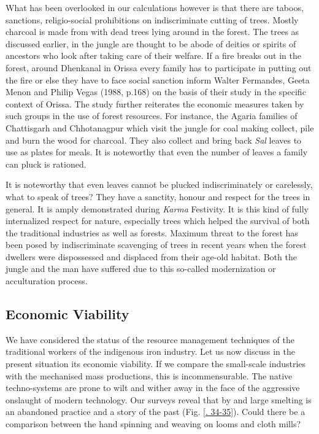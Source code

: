 What has been overlooked in our calculations however is that there are taboos, sanctions, religio-social prohibitions on indiscriminate cutting of trees. Mostly charcoal is made from with dead trees lying around in the forest. The trees as discussed earlier, in the jungle are thought to be abode of deities or spirits of ancestors who look after taking care of their welfare. If a fire breaks out in the forest, around Dhenkanal in Orissa every family has to participate in putting out the fire or else they have to face social sanction inform Walter Fermandes, Geeta Menon and Philip Vegas (1988, p.168) on the basis of their study in the specific context of Orissa. The study further reiterates the economic measures taken by such groups in the use of forest resources. For instance, the Agaria families of Chattisgarh and Chhotanagpur which visit the jungle for coal making collect, pile and burn the wood for charcoal. They also collect and bring back {\it Sal} leaves to use as plates for meals. It is noteworthy that even the number of leaves a family can pluck is rationed. 

It is noteworthy that even leaves cannot be plucked indiscriminately or carelessly, what to speak of trees? They have a sanctity, honour and respect for the trees in general. It is amply demonstrated during {\it Karma} Festivity. It is this kind of fully internalized respect for nature, especially trees which helped the survival of both the traditional industries as well as forests. Maximum threat to the forest has been posed by indiscriminate scavenging of trees in recent years when the forest dwellers were dispossessed and displaced from their age-old habitat. Both the jungle and the man have suffered due to this so-called modernization or acculturation process.

\vspace{-.3cm}

\subsection*{Economic Viability}\label{chapter7-subsection-7.1d}

\vspace{-.2cm}

We have considered the status of the resource management techniques of the traditional workers of the indigenous iron industry. Let us now discuss in the present situation its economic viability. If we compare the small-scale industries with the mechanised mass productions, this is incommensurable. The native techno-systems are prone to wilt and wither away in the face of the aggressive onslaught of modern technology. Our surveys reveal that by and large smelting is an abandoned practice and a story of the past (Fig. \ref{. 34-35}). Could there be a comparison between the hand spinning and weaving on looms and cloth mills?

